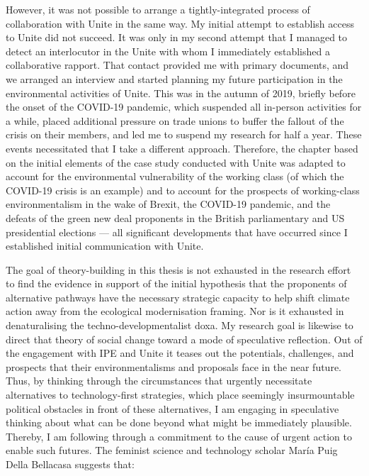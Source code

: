 \documentclass[a4paper, nobind]{templates/ociamthesis}
\begin{document}
However, it was not possible to arrange a tightly-integrated process of collaboration with Unite in the same way. My initial attempt to establish access to Unite did not succeed. It was only in my second attempt that I managed to detect an interlocutor in the Unite with whom I immediately established a collaborative rapport. That contact provided me with primary documents, and we arranged an interview and started planning my future participation in the environmental activities of Unite. This was in the autumn of 2019, briefly before the onset of the COVID-19 pandemic, which suspended all in-person activities for a while, placed additional pressure on trade unions to buffer the fallout of the crisis on their members, and led me to suspend my research for half a year. These events necessitated that I take a different approach. Therefore, the chapter based on the initial elements of the case study conducted with Unite was adapted to account for the environmental vulnerability of the working class (of which the COVID-19 crisis is an example) and to account for the prospects of working-class environmentalism in the wake of Brexit, the COVID-19 pandemic, and the defeats of the green new deal proponents in the British parliamentary and US presidential elections --- all significant developments that have occurred since I established initial communication with Unite.

The goal of theory-building in this thesis is not exhausted in the research effort to find the evidence in support of the initial hypothesis that the proponents of alternative pathways have the necessary strategic capacity to help shift climate action away from the ecological modernisation framing. Nor is it exhausted in denaturalising the techno-developmentalist doxa. My research goal is likewise to direct that theory of social change toward a mode of speculative reflection. Out of the engagement with IPE and Unite it teases out the potentials, challenges, and prospects that their environmentalisms and proposals face in the near future. Thus, by thinking through the circumstances that urgently necessitate alternatives to technology-first strategies, which place seemingly insurmountable political obstacles in front of these alternatives, I am engaging in speculative thinking about what can be done beyond what might be immediately plausible. Thereby, I am following through a commitment to the cause of urgent action to enable such futures. The feminist science and technology scholar María Puig Della Bellacasa suggests that:
\end{document}
